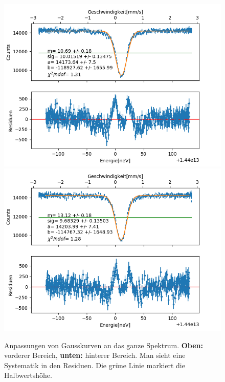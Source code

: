 \documentclass[12pt,a4paper]{article}
\begin{document}
\begin{figure}
\centering
\includegraphics[scale=0.8]{Bilder/Einlinien/Ein_gauss_vor.png}
\includegraphics[scale=0.8]{Bilder/Einlinien/Ein_gauss_nach.png}
\caption{Anpassungen von Gausskurven an das ganze Spektrum. \textbf{Oben:} vorderer Bereich, \textbf{unten:} hinterer Bereich. Man sieht eine Systematik in den Residuen. Die grüne Linie markiert die Halbwertshöhe.}
\label{fig:Ein_gauss}
\end{figure}
\end{document}
